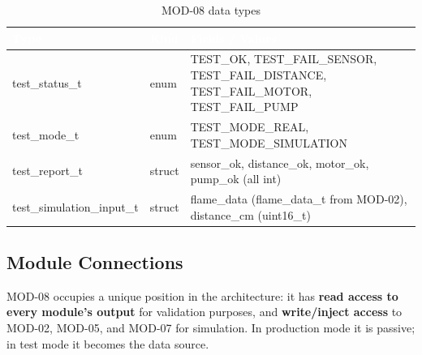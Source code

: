 \documentclass[12pt,a4paper]{article}
\newcommand{\theadtext}[1]{\textcolor{white}{\textbf{#1}}}
\newcommand{\fn}[1]{{\footnotesize\ttfamily #1}}
\begin{document}
\begin{table}[H]
\centering\small
\begin{tabularx}{\textwidth}{L{4.5cm} L{2cm} X}
\toprule
{}
\theadtext{Type} & \theadtext{Kind} & \theadtext{Fields / Values} \\
\midrule
{}   \fn{test\_status\_t}            & enum   & \fn{TEST\_OK}, \fn{TEST\_FAIL\_SENSOR}, \fn{TEST\_FAIL\_DISTANCE}, \fn{TEST\_FAIL\_MOTOR}, \fn{TEST\_FAIL\_PUMP} \\
 \fn{test\_mode\_t}              & enum   & \fn{TEST\_MODE\_REAL}, \fn{TEST\_MODE\_SIMULATION} \\
   \fn{test\_report\_t}            & struct & \fn{sensor\_ok}, \fn{distance\_ok}, \fn{motor\_ok}, \fn{pump\_ok} (all \fn{int}) \\
 \fn{test\_simulation\_input\_t} & struct & \fn{flame\_data} (\fn{flame\_data\_t} from MOD-02), \fn{distance\_cm} (\fn{uint16\_t}) \\
\bottomrule
\end{tabularx}
\caption{MOD-08 data types}
\end{table}

\subsection{Module Connections}

MOD-08 occupies a unique position in the architecture: it has \textbf{read access
to every module's output} for validation purposes, and \textbf{write/inject access}
to MOD-02, MOD-05, and MOD-07 for simulation. In production mode it is passive;
in test mode it becomes the data source.
\end{document}
